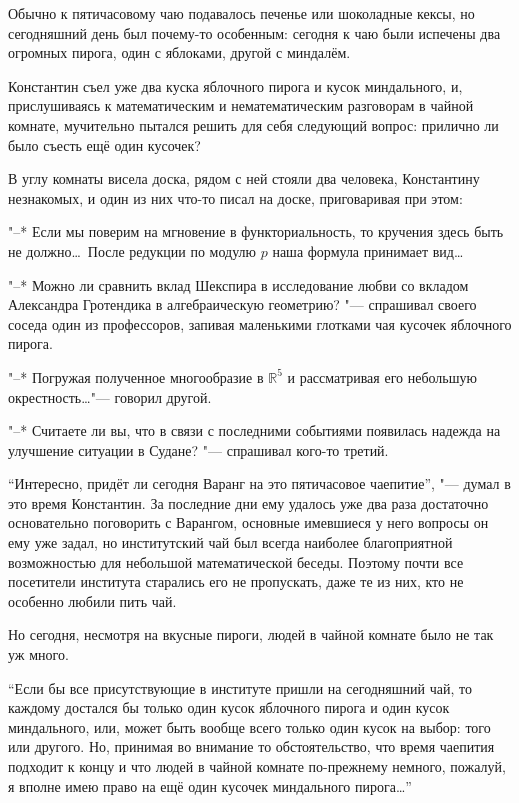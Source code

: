 \medskip
Обычно к пятичасовому чаю подавалось печенье или шоколадные кексы, но
сегодняшний день был почему-то особенным: сегодня к чаю были испечены два
огромных пирога, один с яблоками, другой с миндалём.

Константин съел уже два куска яблочного пирога и кусок миндального, и,
прислушиваясь к математическим и нематематическим разговорам в чайной комнате,
мучительно пытался решить для себя следующий вопрос: прилично ли было съесть ещё
один кусочек?

В углу комнаты висела доска, рядом с ней стояли два человека, Константину
незнакомых, и один из них что-то писал на доске, приговаривая при этом:

"--* Если мы поверим на мгновение в функториальность, то кручения здесь быть не
должно\ldots\
После редукции по модулю $p$ наша формула принимает вид\ldots

"--* Можно ли сравнить вклад Шекспира в исследование любви со вкладом Александра
Гротендика в алгебраическую геометрию? "--- спрашивал своего соседа один из
профессоров, запивая маленькими глотками чая кусочек яблочного пирога.

"--* Погружая полученное многообразие в $\mathbb{R}^5$ и рассматривая его
небольшую окрестность\ldots "--- говорил другой.

"--* Считаете ли вы, что в связи с последними событиями появилась надежда на
улучшение ситуации в Судане? "--- спрашивал кого-то третий.

\enquote{Интересно, придёт ли сегодня Варанг на это пятичасовое чаепитие}, "---
думал в это время Константин.
За последние дни ему удалось уже два раза достаточно основательно поговорить с
Варангом, основные имевшиеся у него вопросы он ему уже задал, но институтский
чай был всегда наиболее благоприятной возможностью для небольшой математической
беседы.
Поэтому почти все посетители института старались его не пропускать, даже те из
них, кто не особенно любили пить чай.

Но сегодня, несмотря на вкусные пироги, людей в чайной комнате было не так уж
много.

\enquote{Если бы все присутствующие в институте пришли на сегодняшний чай, то
каждому достался бы только один кусок яблочного пирога и один кусок миндального,
или, может быть вообще всего только один кусок на выбор: того или другого.
Но, принимая во внимание то обстоятельство, что время чаепития подходит к концу
и что людей в чайной комнате по-прежнему немного, пожалуй, я вполне имею право
на ещё один кусочек миндального пирога\ldots}

